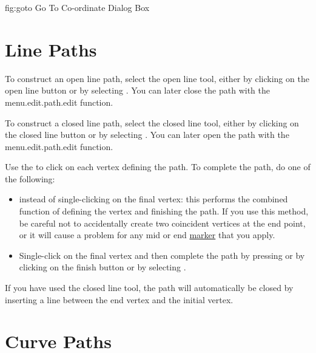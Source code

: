 \FloatFig
  {fig:goto}
  {}
  {Go To Co-ordinate Dialog Box}



\section{Line Paths}\label{sec:newlinepath}


To construct an open line \gls{path}, select the open line tool,
either by clicking on the open line button or by selecting
. You can later close the \gls{path}
with the \gls{menu.edit.path.edit} function.


To construct a closed line \gls{path}, select the closed line tool,
either by clicking on the closed line button or by selecting
. You can later open the \gls{path}
with the \gls{menu.edit.path.edit} function.

Use the  to click on each vertex
defining the path. To complete the \gls{path}, do one of the following:
\begin{itemize}
\item {} instead of single-clicking
on the final vertex: this performs the combined function of defining
the vertex and finishing the path. If you use this method, be
careful not to accidentally create two coincident vertices at the
end point, or it will cause a problem for any mid or end
\hyperref[sec:markers]{marker} that you apply.

\item Single-\gls{click} on the final vertex and then
complete the path by pressing  or by
clicking on the finish button or by selecting
.
\end{itemize}
If you have used the closed line tool, the path will automatically
be closed by inserting a line between the end vertex
and the initial vertex.


\section{Curve Paths}\label{sec:newcurvepath}

